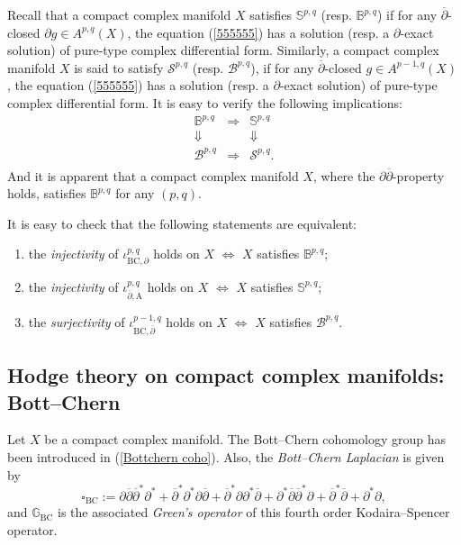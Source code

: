 \documentclass[12pt]{amsart}
\numberwithin{equation}{section}
\theoremstyle{definition}
\theoremstyle{definition}
\theoremstyle{definition}
\renewcommand{\1}{\mathsf{1}}
\newcommand{\G}{\mathbb{G}}
\newcommand{\db}{\overline{\partial}}
\newcommand{\beq}{\begin{equation}}
\newcommand{\eeq}{\end{equation}}
\renewcommand{\>}{\rightarrow}
\newcommand{\p}{\partial}
\def\p{\partial}
\theoremstyle{plain} %
\theoremstyle{plain} %
\theoremstyle{plain} %
\begin{document}
	Recall that  a compact complex manifold $X$ satisfies $\mathbb{S}^{p,q}$ (resp. $\mathbb{B}^{p,q}$)
	if for any $\db$-closed
	$\p g\in A^{p,q}(X)$, the equation (\ref{555555})
	has a solution
	(resp. a $\p$-exact solution) of pure-type complex differential form. Similarly,
	a compact complex manifold $X$ is said to satisfy
	$\mathcal{S}^{p,q}$
	(resp. $\mathcal{B}^{p,q}$), if
	for any $\db$-closed $g\in A^{p-1,q}(X)$, the equation (\ref{555555}) has a solution
	(resp. a $\p$-exact solution)  of pure-type complex differential form. It is easy to verify the following implications:
	\[ \begin{array}{ccc}
		\mathbb{B}^{p,q} & \Rightarrow & \mathbb{S}^{p,q} \\
		\Downarrow &   & \Downarrow \\
		\mathcal{B}^{p,q} & \Rightarrow & \mathcal{S}^{p,q}. \\
	\end{array} \]
	And it is apparent that a compact complex manifold $X$, where the $\p\db$-property holds, satisfies
	$\mathbb{B}^{p,q}$ for any $(p,q)$.
	
	It is easy to check that the following statements are equivalent:
	\begin{enumerate}\label{equivalent }
		\item\label{equ 1}
		the \textit{injectivity} of $\iota^{p,q}_{\mathrm {BC},\p}$ holds on $X$ $\Leftrightarrow$
		{$X$ satisfies $\mathbb{B}^{p,q}$};
		\item\label{equ2}
		the \textit{injectivity} of $\iota^{p,q}_{\db,\mathrm{A}}$ holds on $X$ $\Leftrightarrow$
		$X$ satisfies $\mathbb{S}^{p,q}$;
		\item\label{equ3}
		{the \textit{surjectivity} of $\iota^{p-1,q}_{\mathrm {BC},\db}$ holds on $X$} $\Leftrightarrow$
		{$X$ satisfies $\mathcal{B}^{p,q}$}.
	\end{enumerate}
	\subsection{Hodge theory on compact complex manifolds: Bott--Chern}
	Let $X$ be a compact complex manifold. The Bott--Chern cohomology group has been introduced in (\ref{Bottchern coho}).
	Also, the \textit{Bott--Chern Laplacian} is given by
	\beq\label{bc-Lap}
	\square_{{\mathrm {BC}}}:=\p\db\db^*\p^*+\db^*\p^*\p\db+\db^*\p\p^*\db+\p^*\db\db^*\p+\db^*\db+\p^*\p,
	\eeq and $\G_{\mathrm {BC}}$ is the associated \textit{Green's operator} of
	this  fourth order Kodaira--Spencer
	operator. 
    
\end{document}
